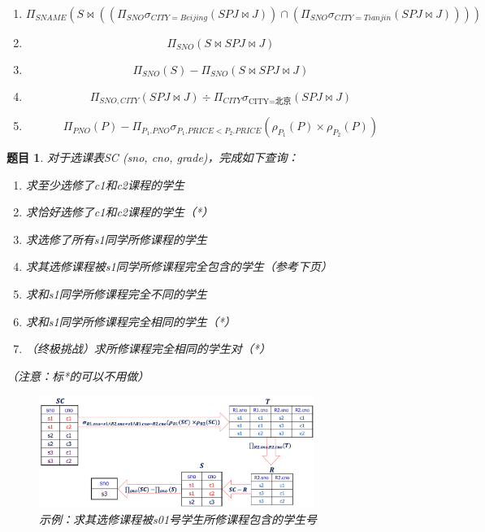 \documentclass[12pt]{article} %
\theoremstyle{problemstyle} %
\newtheorem{problem}{题目} %
\newenvironment{solution}
  {%
    \renewcommand\qedsymbol{$\blacksquare$}%
    \proof[\textit{解答}]\mbox{}\vspace{-4ex}\\%
  }
  {\endproof}
\begin{document}
\begin{solution}

\begin{enumerate}
  \item 
  \[
    \Pi_{SNAME}
    \left(
      S \bowtie
      \left(
      \left(\Pi_{SNO}\sigma_{CITY=Beijing}\left(SPJ \bowtie J\right)\right)
      \cap
      \left(\Pi_{SNO}\sigma_{CITY=Tianjin}\left(SPJ \bowtie J\right)\right)
      \right)
    \right)
  \]
  \item 
  \[
    \Pi_{SNO}
    \left(
      S \bowtie SPJ \bowtie J
    \right)
  \]
  \item 
  \[
    \Pi_{SNO}
    \left(S\right)-
    \Pi_{SNO}
    \left(
      S \bowtie SPJ \bowtie J
    \right)
  \]
  \item 
  \[
    \Pi_{SNO, CITY}\left(SPJ\bowtie J\right)
    \div
    \Pi_{CITY}\sigma_{\text{CITY=北京}}\left(SPJ\bowtie J\right)
  \]
  \item 
  \[
    \Pi_{PNO}\left(P\right)-
    \Pi_{P_1.PNO}\sigma_{P_1.PRICE<P_2.PRICE}\left(\rho_{P_1}(P)\times \rho_{P_2}(P)\right)
  \]
\end{enumerate}

\end{solution}

\begin{problem}
对于选课表SC (sno, cno, grade)，完成如下查询：

\begin{enumerate}
  \item 求至少选修了c1和c2课程的学生
  \item 求恰好选修了c1和c2课程的学生（*）
  \item 求选修了所有s1同学所修课程的学生
  \item 求其选修课程被s1同学所修课程完全包含的学生（参考下页）
  \item 求和s1同学所修课程完全不同的学生
  \item 求和s1同学所修课程完全相同的学生（*）
  \item （终极挑战）求所修课程完全相同的学生对（*）
\end{enumerate}

（注意：标*的可以不用做）

\begin{figure}[H]
  \centering
  \includegraphics[width=0.8\textwidth]{./figs/2.1.png}
  \caption{示例：求其选修课程被s01号学生所修课程包含的学生号}
\end{figure}

\end{problem}  
\end{document}
